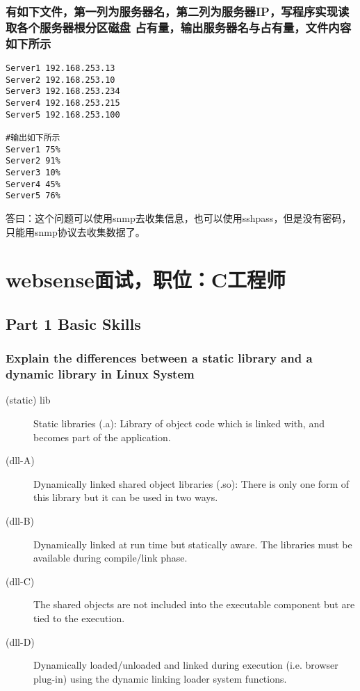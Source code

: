 \documentclass{article}
\begin{document}
\subsubsection{有如下文件，第一列为服务器名，第二列为服务器IP，写程序实现读取各个服务器根分区磁盘
占有量，输出服务器名与占有量，文件内容如下所示}
\begin{verbatim}
Server1 192.168.253.13
Server2 192.168.253.10
Server3 192.168.253.234
Server4 192.168.253.215
Server5 192.168.253.100

#输出如下所示
Server1 75%
Server2 91%
Server3 10%
Server4 45%
Server5 76%
\end{verbatim}
答曰：这个问题可以使用snmp去收集信息，也可以使用sshpass，但是没有密码，只能用snmp协议去收集数据了。


\section{websense面试，职位：C工程师}
\subsection{Part 1 Basic Skills}
\subsubsection{Explain the differences between a static library and a dynamic library in Linux System}
\begin{description}
\item[(static) lib]Static libraries (.a): Library of object code which is linked with, and becomes part of the application.
\item[(dll-A)]Dynamically linked shared object libraries (.so): There is only one form of this library but it can be used in two ways.
\item[(dll-B)]Dynamically linked at run time but statically aware. The libraries must be available during compile/link phase. 
\item[(dll-C)]The shared objects are not included into the executable component but are tied to the execution.
\item[(dll-D)]Dynamically loaded/unloaded and linked during execution (i.e. browser plug-in) using the dynamic linking loader system functions.
\end{description}
\end{document}
